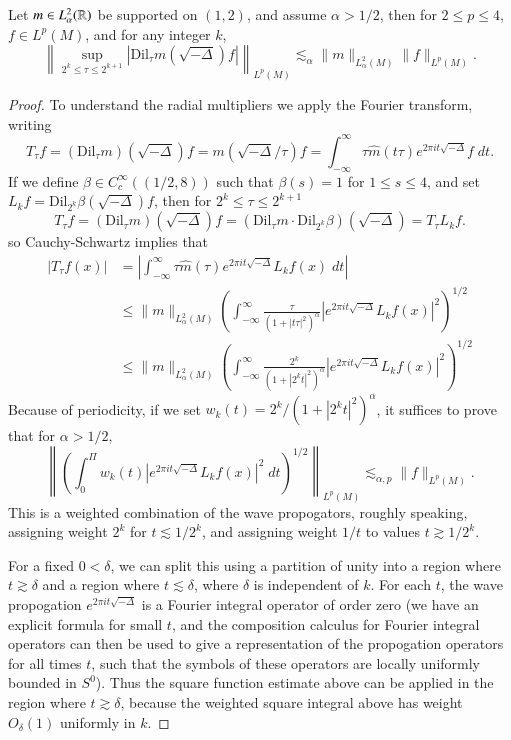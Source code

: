 \begin{theorem}
    Let $m \in L^2_\alpha(\operatorname{\mathbb{R}})$ be supported on $(1,2)$, and assume $\alpha > 1/2$, then for $2 \leq p \leq 4$, $f \in L^p(M)$, and for any integer $k$,
    \[ \left\| \sup_{2^k \leq \tau \leq 2^{k+1}} |\text{Dil}_\tau m(\sqrt{-\Delta}) f| \right\|_{L^p(M)} \lesssim_\alpha \| m \|_{L^2_\alpha(M)} \| f \|_{L^p(M)}. \]
\end{theorem}
\begin{proof}
    To understand the radial multipliers we apply the Fourier transform, writing
    \[ T_\tau f = (\text{Dil}_\tau m)(\sqrt{-\Delta}) f = m(\sqrt{-\Delta} / \tau) f = \int_{-\infty}^\infty \tau \widehat{m}(t \tau) e^{2 \pi i t \sqrt{-\Delta}} f\; dt. \]
    If we define $\beta \in C_c^\infty((1/2,8))$ such that $\beta(s) = 1$ for $1 \leq s \leq 4$, and set $L_k f = \text{Dil}_{2^k} \beta(\sqrt{-\Delta}) f$, then for $2^k \leq \tau \leq 2^{k+1}$
    \[ T_\tau f = (\text{Dil}_\tau m)(\sqrt{-\Delta}) f = (\text{Dil}_\tau m \cdot \text{Dil}_{2^k} \beta)(\sqrt{-\Delta}) = T_\tau L_k f. \]
    so Cauchy-Schwartz implies that
    \begin{align*}
        |T_\tau f(x)| &= \left| \int_{-\infty}^\infty \tau \widehat{m}(\tau) e^{2 \pi i t \sqrt{-\Delta}} L_k f(x)\; dt \right|\\
        &\leq \| m \|_{L^2_\alpha(M)} \left( \int_{-\infty}^\infty \frac{\tau}{(1 + |t \tau|^2)^\alpha} |e^{2 \pi i t \sqrt{-\Delta}} L_k f(x)|^2 \right)^{1/2}\\
        &\leq \| m \|_{L^2_\alpha(M)} \left( \int_{-\infty}^\infty \frac{2^k}{(1 + |2^k t|^2)^\alpha} |e^{2 \pi i t \sqrt{-\Delta}} L_k f(x)|^2 \right)^{1/2}
    \end{align*}
    Because of periodicity, if we set $w_k(t) = 2^k / (1 + |2^k t|^2)^\alpha$, it suffices to prove that for $\alpha > 1/2$,
    \[ \left\| \left( \int_0^\Pi w_k(t) |e^{2 \pi i t \sqrt{-\Delta}} L_k f(x)|^2\; dt \right)^{1/2} \right\|_{L^p(M)} \lesssim_{\alpha,p} \| f \|_{L^p(M)}. \]
    This is a weighted combination of the wave propogators, roughly speaking, assigning weight $2^k$ for $t \lesssim 1/2^k$, and assigning weight $1/t$ to values $t \gtrsim 1/2^k$.

    For a fixed $0 < \delta$, we can split this using a partition of unity into a region where $t \gtrsim \delta$ and a region where $t \lesssim \delta$, where $\delta$ is independent of $k$. For each $t$, the wave propogation $e^{2 \pi i t \sqrt{-\Delta}}$ is a Fourier integral operator of order zero (we have an explicit formula for small $t$, and the composition calculus for Fourier integral operators can then be used to give a representation of the propogation operators for all times $t$, such that the symbols of these operators are locally uniformly bounded in $S^0$). Thus the square function estimate above can be applied in the region where $t \gtrsim \delta$, because the weighted square integral above has weight $O_\delta(1)$ uniformly in $k$.


\end{proof}
